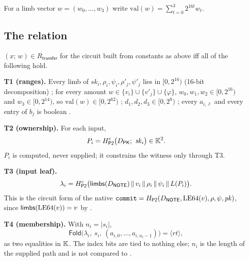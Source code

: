 For a limb vector $w=(w_0,\dots,w_3)$ write $\mathrm{val}(w)=\sum_{t=0}^{3}2^{16t}w_t$.

\subsection{The relation}

\begin{definition}
\label{def:rtransfer}
$(x;\,w)\in R_{\mathsf{transfer}}$ for the circuit built from constants as above
iff all of the following hold.

\medskip\noindent\textbf{T1 (ranges).} Every limb of $\mathit{sk}_i,\rho_i,\psi_i,\rho'_j,\psi'_j$
lies in $[0,2^{16})$ (16-bit decomposition) ;
for every amount $w\in\{v_i\}\cup\{v'_j\}\cup\{\varphi\}$, $w_0,w_1,w_2\in[0,2^{16})$
and $w_3\in[0,2^{14})$, so $\mathrm{val}(w)\in[0,2^{62})$
; $d_1,d_2,d_3\in[0,2^{8})$
; every $a_{i,\ell}$ and every
entry of $b_j$ is boolean 
.

\medskip\noindent\textbf{T2 (ownership).} For each input,
\[
  P_i = \Hp^{\mathrm{c}}\big(D_{\mathsf{PK}};\ \mathit{sk}_i\big)\in\K^2 .
\]
$P_i$ is computed, never supplied; it constrains the witness only through T3.

\medskip\noindent\textbf{T3 (input leaf).}
\[
  \lambda_i = H_{\mathsf{P2}}^{\mathrm{c}}\big(\mathsf{limbs}(D_{\mathsf{NOTE}})\,\|\,v_i\,\|\,\rho_i\,\|\,\psi_i\,\|\,L(P_i)\big).
\]
This is the circuit form of the native
$\texttt{commit}=H_{\mathsf{P2}}(D_{\mathsf{NOTE}},\mathrm{LE64}(v),\rho,\psi,\mathit{pk})$, since
$\mathsf{limbs}(\mathrm{LE64}(v))=v$ by 
.

\medskip\noindent\textbf{T4 (membership).} With $n_i=|s_i|$,
\[
  \mathsf{Fold}\big(\lambda_i,\ s_i,\ (a_{i,0},\dots,a_{i,n_i-1})\big) = \langle rt\rangle ,
\]
as two equalities in $\mathbb{K}$. 
The index bits are tied to nothing else; $n_i$ is the length of the supplied
path and is not compared to  .


\end{definition}
